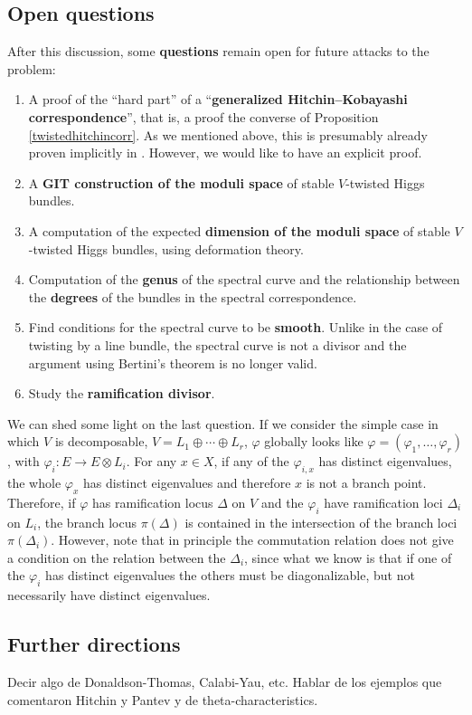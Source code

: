 \documentclass[12pt,a4paper]{book}
\theoremstyle{definition} \newtheorem{defn}[thm]{Definition}
\theoremstyle{definition} \newtheorem{ejemplo}[thm]{Example}
\theoremstyle{remark} \newtheorem{rem}[thm]{Remark}
\begin{document}
  \subsection*{Open questions}
  After this discussion, some \textbf{questions} remain open for future attacks to the problem:
  \begin{enumerate}
    \item A proof of the ``hard part'' of a ``\textbf{generalized Hitchin--Kobayashi correspondence}'', that is, a proof the converse of Proposition \ref{twistedhitchincorr}. As we mentioned above, this is presumably already proven implicitly in \cite{oscar}. However, we would like to have an explicit proof.
    \item A \textbf{GIT construction of the moduli space} of stable $V$-twisted Higgs bundles.
    \item A computation of the expected \textbf{dimension of the moduli space} of stable $V$-twisted Higgs bundles, using deformation theory.
    \item Computation of the \textbf{genus} of the spectral curve and the relationship between the \textbf{degrees} of the bundles in the spectral correspondence.
    \item Find conditions for the spectral curve to be \textbf{smooth}. Unlike in the case of twisting by a line bundle, the spectral curve is not a divisor and the argument using Bertini's theorem is no longer valid.
    \item Study the \textbf{ramification divisor}.
  \end{enumerate}

  We can shed some light on the last question. If we consider the simple case in which $V$ is decomposable, $V=L_1 \oplus \cdots \oplus L_r$, $\varphi$ globally looks like $\varphi=(\varphi_1,\dots,\varphi_r)$, with $\varphi_i: E\rightarrow E\otimes L_i$. For any $x\in X$, if any of the $\varphi_{i,x}$ has distinct eigenvalues, the whole $\varphi_x$ has distinct eigenvalues and therefore $x$ is not a branch point. Therefore, if $\varphi$ has ramification locus $\Delta$ on $V$ and the $\varphi_i$ have ramification loci $\Delta_i$ on $L_i$, the branch locus $\pi(\Delta)$ is contained in the intersection of the branch loci $\pi(\Delta_i)$. However, note that in principle the commutation relation does not give a condition on the relation between the $\Delta_i$, since what we know is that if one of the $\varphi_i$ has distinct eigenvalues the others must be diagonalizable, but not necessarily have distinct eigenvalues.

  \subsection*{Further directions}
 Decir algo de Donaldson-Thomas, Calabi-Yau, etc. Hablar de los ejemplos que comentaron Hitchin y Pantev y de theta-characteristics.

\newpage\null\thispagestyle{empty}
\nocite{*}


\end{document}
